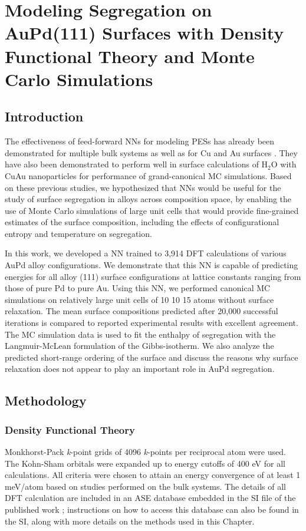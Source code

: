 \documentclass[12pt]{cmuthesis}
\begin{document}
\chapter{Modeling Segregation on AuPd(111) Surfaces with Density Functional Theory and Monte Carlo Simulations}
\label{sec:ch6}
\section{Introduction}
\label{sec:org0944a0a}
The effectiveness of feed-forward NNs for modeling PESs has already been demonstrated for multiple bulk systems \cite{behler-2008-press,eshet-2010-ab,khaliullin-2010-graph} as well as for Cu and Au surfaces \cite{artrith-2012-high,boes-2016-neural-networ}. They have also been demonstrated to perform well in surface calculations of H\(_{\text{2}}\)O with CuAu nanoparticles \cite{artrith-2015-grand-cu} for performance of grand-canonical MC simulations. Based on these previous studies, we hypothesized that NNs would be useful for the study of surface segregation in alloys across composition space, by enabling the use of Monte Carlo simulations of large unit cells that would provide fine-grained estimates of the surface composition, including the effects of configurational entropy and temperature on segregation.

In this work, we developed a NN trained to 3,914 DFT calculations of various AuPd alloy configurations. We demonstrate that this NN is capable of predicting energies for all alloy (111) surface configurations at lattice constants ranging from those of pure Pd to pure Au. Using this NN, we performed canonical MC simulations on relatively large unit cells of 10 \texttimes{} 10 \texttimes{} 15 atoms without surface relaxation. The mean surface compositions predicted after 20,000 successful iterations is compared to reported experimental results with excellent agreement. The MC simulation data is used to fit the enthalpy of segregation with the Langmuir-McLean formulation of the Gibbs-isotherm. We also analyze the predicted short-range ordering of the surface and discuss the reasons why surface relaxation does not appear to play an important role in AuPd segregation.

\section{Methodology}
\label{sec:org06b0e6e}
\subsection{Density Functional Theory}
\label{sec:orgb8a1c00}
Monkhorst-Pack \emph{k}-point grids \cite{monkhorst-1976-special-point} of 4096 \emph{k}-points per reciprocal atom were used. The Kohn-Sham orbitals were expanded up to energy cutoffs of 400 eV for all calculations. All criteria were chosen to attain an energy convergence of at least 1 meV/atom based on studies performed on the bulk systems. The details of all DFT calculation are included in an ASE database embedded in the SI file of the published work \cite{boes-2017-model-segreg}; instructions on how to access this database can also be found in the SI, along with more details on the methods used in this Chapter.
\end{document}
